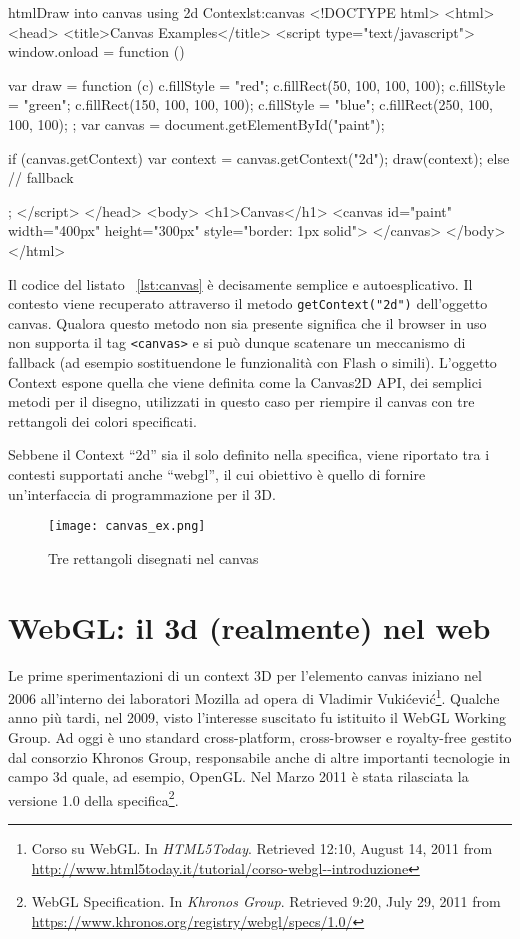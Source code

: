 \begin{mylisting}{html}{Draw into canvas using 2d Contex}{lst:canvas}
<!DOCTYPE html>
<html>
<head>
<title>Canvas Examples</title>
<script type="text/javascript">
window.onload = function () {
    var draw = function (c) {
        c.fillStyle = "red";
        c.fillRect(50, 100, 100, 100);
        c.fillStyle = "green";
        c.fillRect(150, 100, 100, 100);
        c.fillStyle = "blue";
        c.fillRect(250, 100, 100, 100);        
    };
    var canvas = document.getElementById("paint");

    if (canvas.getContext) {
        var context = canvas.getContext("2d");
        draw(context);
    } else {
        // fallback
    }
};    
</script>
</head>
<body>
    <h1>Canvas</h1>
    <canvas id="paint" width="400px" height="300px" style="border: 1px solid"> 
    </canvas>
</body>
</html>
\end{mylisting}

Il codice del listato ~\ref{lst:canvas} è decisamente semplice e autoesplicativo. Il contesto viene recuperato attraverso il metodo \texttt{getContext("2d")} dell'oggetto canvas. Qualora questo metodo non sia presente significa che il browser in uso non supporta il tag \texttt{<canvas>} e si può dunque scatenare un meccanismo di fallback (ad esempio sostituendone le funzionalità con Flash o simili). L'oggetto Context espone quella che viene definita come la Canvas2D API, dei semplici metodi per il disegno, utilizzati in questo caso per riempire il canvas con tre rettangoli dei colori specificati.

Sebbene il Context ``2d'' sia il solo definito nella specifica, viene riportato tra i contesti supportati anche ``webgl'', il cui obiettivo è quello di fornire un'interfaccia di programmazione per il 3D.

\begin{figure}[Ht]
\centering
\texttt{[image: canvas\_ex.png]}
\caption{Tre rettangoli disegnati nel canvas}
\label{label:canvasex}
\end{figure}
\clearpage

\section{WebGL: il 3d (realmente) nel web}
Le prime sperimentazioni di un context 3D per l'elemento canvas iniziano nel 2006 all'interno dei laboratori Mozilla ad opera di Vladimir Vukićević\footnote{Corso su WebGL. In \textit{HTML5Today}. Retrieved 12:10, August 14, 2011 from \url{http://www.html5today.it/tutorial/corso-webgl--introduzione}}. Qualche anno più tardi, nel 2009, visto l'interesse suscitato fu istituito il WebGL Working Group. Ad oggi è uno standard cross-platform, cross-browser e royalty-free gestito dal consorzio Khronos Group, responsabile anche di altre importanti tecnologie in campo 3d quale, ad esempio, OpenGL. Nel Marzo 2011 è stata rilasciata la versione 1.0 della specifica\footnote{WebGL Specification. In \textit{Khronos Group}. Retrieved 9:20, July 29, 2011 from \url{https://www.khronos.org/registry/webgl/specs/1.0/}}.

